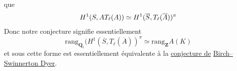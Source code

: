 que
\[
H^1(S,AT_\ell(A))\simeq H^1(\overline{S},T_\ell(\overline{A}))^\pi
\]
Donc notre conjecture signifie essentiellement
\[
\mathrm{rang}_{\mathbf{Q}_\ell}(H^1(\overline{S},T_\ell(\overline{A}))^\pi\simeq\mathrm{rang}_{\mathbf{Z}}A(K)
\]
et sous cette forme est essentiellement équivalente à la \uline{conjecture de}  \uline{Birch--Swinnerton Dyer}.
